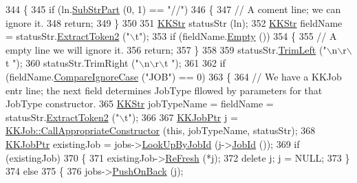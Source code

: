 \begin{DoxyCode}
344 \{
345   \textcolor{keywordflow}{if}  (ln.\hyperlink{class_k_k_b_1_1_k_k_str_a5f20b2ddfc9f07c8ef99592810332ddb}{SubStrPart} (0, 1) == \textcolor{stringliteral}{"//"})
346   \{
347     \textcolor{comment}{// A coment line;  we can ignore it.}
348     \textcolor{keywordflow}{return};
349   \}
350 
351   \hyperlink{class_k_k_b_1_1_k_k_str}{KKStr}  statusStr (ln);
352   \hyperlink{class_k_k_b_1_1_k_k_str}{KKStr}  fieldName = statusStr.\hyperlink{class_k_k_b_1_1_k_k_str_afe41140cee0520f0be8a3022938a1b03}{ExtractToken2} (\textcolor{stringliteral}{"\(\backslash\)t"});
353   \textcolor{keywordflow}{if}  (fieldName.\hyperlink{class_k_k_b_1_1_k_k_str_ac69942f73fffd672ec2a6e1c410afdb6}{Empty} ())
354   \{
355     \textcolor{comment}{// A empty line we will ignore it.}
356     \textcolor{keywordflow}{return};
357   \}
358 
359   statusStr.\hyperlink{class_k_k_b_1_1_k_k_str_af7c102c53103ddff3f48270b4a198c89}{TrimLeft} (\textcolor{stringliteral}{"\(\backslash\)n\(\backslash\)r\(\backslash\)t "});
360   statusStr.TrimRight (\textcolor{stringliteral}{"\(\backslash\)n\(\backslash\)r\(\backslash\)t "});
361 
362   \textcolor{keywordflow}{if}  (fieldName.\hyperlink{class_k_k_b_1_1_k_k_str_a3fd779d448f27e24170c9c05fca5208e}{CompareIgnoreCase} (\textcolor{stringliteral}{"JOB"}) == 0)
363   \{
364     \textcolor{comment}{// We have a KKJob entr line;  the next field determines JobType fllowed by parameters for that JobType
       constructor.}
365     \hyperlink{class_k_k_b_1_1_k_k_str}{KKStr}  jobTypeName = fieldName = statusStr.\hyperlink{class_k_k_b_1_1_k_k_str_afe41140cee0520f0be8a3022938a1b03}{ExtractToken2} (\textcolor{stringliteral}{"\(\backslash\)t"});
366 
367     \hyperlink{class_k_k_job_managment_1_1_k_k_job}{KKJobPtr}  j = \hyperlink{class_k_k_job_managment_1_1_k_k_job_a3dbb74854fbdf42833ebde21f2f44498}{KKJob::CallAppropriateConstructor} (\textcolor{keyword}{this}, 
      jobTypeName, statusStr);
368     \hyperlink{class_k_k_job_managment_1_1_k_k_job}{KKJobPtr}  existingJob = jobs->\hyperlink{class_k_k_job_managment_1_1_k_k_job_list_ac394872bccd2a9a21833b7a86dc12165}{LookUpByJobId} (j->\hyperlink{class_k_k_job_managment_1_1_k_k_job_a37a4f0f8bfafda64563f30034348e5f5}{JobId} ());
369     \textcolor{keywordflow}{if}  (existingJob)
370     \{
371       existingJob->\hyperlink{class_k_k_job_managment_1_1_k_k_job_a453bf2aa757cfd9630838f0ab13a3b73}{ReFresh} (*j);
372       \textcolor{keyword}{delete}  j;  j = NULL;
373     \}
374     \textcolor{keywordflow}{else}
375     \{
376       jobs->\hyperlink{class_k_k_job_managment_1_1_k_k_job_list_abdf9dda2d50a190862d0d82e6597494d}{PushOnBack} (j);

\end{DoxyCode}
